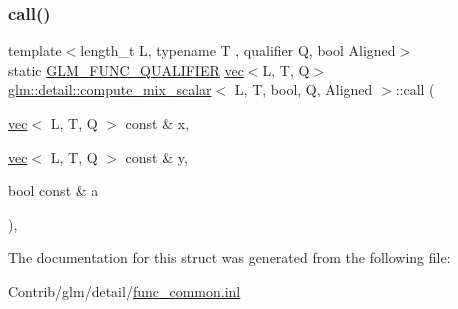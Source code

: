 \subsubsection{\texorpdfstring{call()}{call()}}
{\footnotesize\ttfamily template$<$length\+\_\+t L, typename T , qualifier Q, bool Aligned$>$ \\
static \mbox{\hyperlink{setup_8hpp_a33fdea6f91c5f834105f7415e2a64407}{G\+L\+M\+\_\+\+F\+U\+N\+C\+\_\+\+Q\+U\+A\+L\+I\+F\+I\+ER}} \mbox{\hyperlink{structglm_1_1vec}{vec}}$<$L, T, Q$>$ \mbox{\hyperlink{structglm_1_1detail_1_1compute__mix__scalar}{glm\+::detail\+::compute\+\_\+mix\+\_\+scalar}}$<$ L, T, bool, Q, Aligned $>$\+::call (\begin{DoxyParamCaption}\item[{\mbox{\hyperlink{structglm_1_1vec}{vec}}$<$ L, T, Q $>$ const \&}]{x,  }\item[{\mbox{\hyperlink{structglm_1_1vec}{vec}}$<$ L, T, Q $>$ const \&}]{y,  }\item[{bool const \&}]{a }\end{DoxyParamCaption})\hspace{0.3cm}{\ttfamily [inline]}, {\ttfamily [static]}}



The documentation for this struct was generated from the following file\+:\begin{DoxyCompactItemize}
\item 
Contrib/glm/detail/\mbox{\hyperlink{func__common_8inl}{func\+\_\+common.\+inl}}\end{DoxyCompactItemize}
